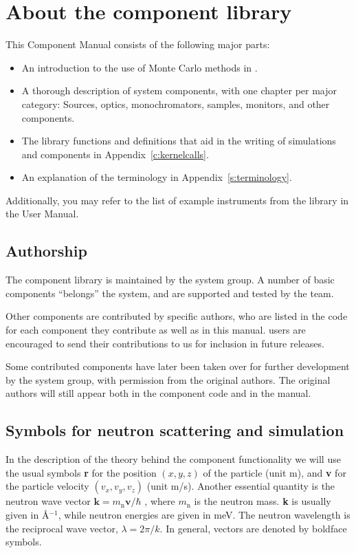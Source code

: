 
\chapter{About the component library}
This \MCS Component Manual consists of the following major parts:\label{c:components}
\begin{itemize}
\item An introduction to the use of Monte Carlo methods in \MCS .
\item A thorough description of system components,
with one chapter per major category: Sources, optics,
monochromators, samples, monitors, and other components.
\item The \MCS library functions and definitions
  that aid in the writing of simulations and components in
  Appendix~\ref{c:kernelcalls}.
\item An explanation of the \MCS terminology in Appendix~\ref{s:terminology}.
\end{itemize}
Additionally, you may refer to the list of example instruments
from the library in the \MCS User Manual.

\section{Authorship}
The component library is
maintained by the \MCS system group. A number of basic components
``belongs'' the \MCS system, and are supported and tested by the \MCS
team.

Other components are contributed
by specific authors, who are listed in the code for each component
they contribute as well as in this manual.
\MCS users are encouraged to send their
contributions to us for inclusion in future releases.

Some contributed components have later been taken over
for further development by the \MCS system
group, with permission from the original authors.
The original authors will still appear both in the component code and in the
\MCS manual.

\section{Symbols for neutron scattering and simulation}
In the description of the theory behind the component functionality
we will use the usual symbols \textbf{r} for the position
$(x,y,z)$ of the particle (unit m), and \textbf{v} for
the particle velocity $(v_x, v_y, v_z)$ (unit m/s).
Another essential quantity is the neutron wave vector
$\textbf{k} = m_\textrm{n} \textbf{v}/\hbar$ , where
$m_\textrm{n}$ is the neutron mass. \textbf{k} is usually given in
\AA$^{-1}$, while neutron energies are given in meV.
The neutron wavelength is the reciprocal wave vector,
$\lambda=2 \pi / k$.
In general, vectors are denoted by boldface symbols.

